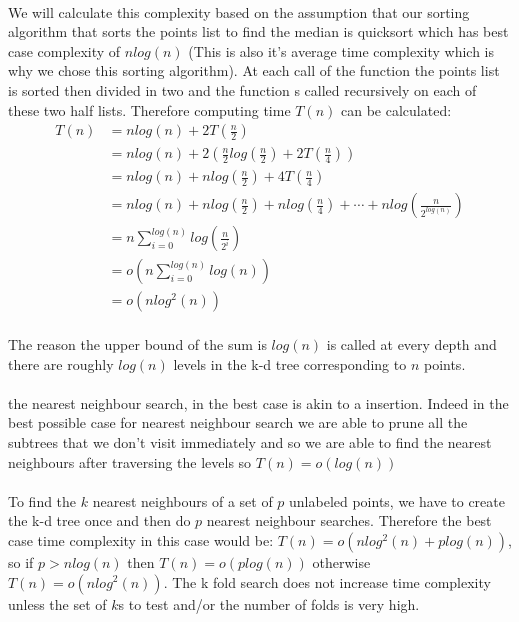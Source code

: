 \documentclass[11 pt]{article}
\begin{document}
\paragraph{}We will calculate this complexity based on the assumption that our sorting algorithm that sorts the points list to find the median is quicksort which has best case complexity of $nlog(n)$ (This is also it's average time complexity which is why we chose this sorting algorithm). At each call of the function the points list is sorted then divided in two and the function s called recursively on each of these two half lists. Therefore computing time $T(n)$ can be calculated:
\begin{align*}
  T(n) &= nlog(n)+2T\left(\frac{n}{2}\right)\\
       &= nlog(n)+2\left(\frac{n}{2}log\left(\frac{n}{2}\right)+2T\left(\frac{n}{4}\right)\right)\\
       &= nlog(n)+nlog\left(\frac{n}{2}\right)+4T\left(\frac{n}{4}\right)\\
       &= nlog(n)+nlog\left(\frac{n}{2}\right)+nlog\left(\frac{n}{4}\right)+\cdots+nlog\left(\frac{n}{2^{log(n)}}\right)\\
       &= n\sum^{log(n)}_{i=0}log\left(\frac{n}{2^i}\right)\\
       &= o\left(n\sum^{log(n)}_{i=0}log(n)\right)\\
       &= o(nlog^2(n))
\end{align*}
\paragraph{}The reason the upper bound of the sum is $log(n)$ is called at every depth and there are roughly $log(n)$ levels in the k-d tree corresponding to $n$ points.
\paragraph{}the nearest neighbour search, in the best case is akin to a insertion. Indeed in the best possible case for nearest neighbour search we are able to prune all the subtrees that we don't visit immediately and so we are able to find the nearest neighbours after traversing the levels so $T(n)=o(log(n))$
\paragraph{}To find the $k$ nearest neighbours of a set of $p$ unlabeled points, we have to create the k-d tree once and then do $p$ nearest neighbour searches. Therefore the best case time complexity in this case would be: $T(n)=o(nlog^2(n)+plog(n))$, so if $p>nlog(n)$ then $T(n) = o(plog(n))$ otherwise $T(n) = o(nlog^2(n))$. The k fold search does not increase time complexity unless the set of $k$s to test and/or the number of folds is very high.
\end{document}
